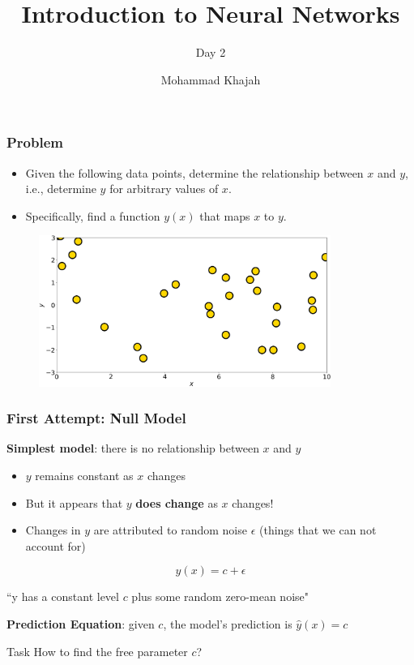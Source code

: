 \documentclass{beamer}
\title{Introduction to Neural Networks}
\subtitle{Day 2}
\author{Mohammad Khajah}
\institute[KISR]{Kuwait Institute for Scientific Research}
\date{}
\begin{document}
\begin{frame}
\titlepage
\end{frame}

\begin{frame}
\frametitle{Problem}

\begin{itemize}
\item Given the following data points, determine the relationship between $x$ and $y$, i.e., determine $y$ for arbitrary values of $x$.
\item Specifically, find a function $y(x)$ that maps $x$ to $y$.
\end{itemize}

\begin{figure}
\includegraphics[width=0.85\textwidth]{../figures/fake_data.png}
\end{figure}

\end{frame}


\begin{frame}
\frametitle{First Attempt: Null Model}

\textbf{Simplest model}:  there is no relationship between $x$ and $y$

\begin{itemize}
\item $y$ remains constant as $x$ changes
\item But it appears that $y$ \textbf{does change} as $x$ changes!
\item Changes in $y$ are attributed to random noise $\epsilon$ (things that we can not account for)
\end{itemize}
\[
y(x) = c + \epsilon 
\]

``y has a constant level $c$ plus some random zero-mean noise"

\textbf{Prediction Equation}:  given $c$, the model's prediction is $\hat{y}(x) = c$

\begin{alertblock}{Task} 
How to find the free parameter $c$?
\end{alertblock}


\end{frame}
\end{document}
